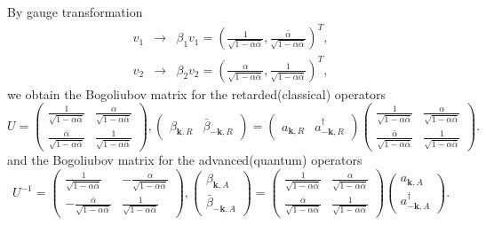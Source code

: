 \documentclass[aps,onecolumn,superscriptaddress,notitlepage,longbibliography]{revtex4-1}
\newcommand{\tmmathbf}[1]{\ensuremath{\boldsymbol{#1}}}
\begin{document}
By gauge transformation
\begin{eqnarray}
  v_1 & \rightarrow & \beta_1 v_1 = \left( \frac{1}{\sqrt{1 - \alpha
  \bar{\alpha}}}, \frac{\bar{\alpha}}{\sqrt{1 - \alpha \bar{\alpha}}}
  \right)^T, \\
  v_2 & \rightarrow & \beta_2 v_2 = \left( \frac{\alpha}{\sqrt{1 - \alpha
  \bar{\alpha}}}, \frac{1}{\sqrt{1 - \alpha \bar{\alpha}}} \right)^T, 
\end{eqnarray}
we obtain the Bogoliubov matrix for the retarded(classical) operators
\begin{equation}
  U = \left(\begin{array}{cc}
    \frac{1}{\sqrt{1 - \alpha \bar{\alpha}}} & \frac{\alpha}{\sqrt{1 - \alpha
    \bar{\alpha}}}\\
    \frac{\bar{\alpha}}{\sqrt{1 - \alpha \bar{\alpha}}} & \frac{1}{\sqrt{1 -
    \alpha \bar{\alpha}}}
  \end{array}\right), \left(\begin{array}{cc}\beta_{\tmmathbf{k}, R} &
    \bar{\beta}_{- \tmmathbf{k}, R}\end{array}\right) = \left(\begin{array}{cc}a_{\tmmathbf{k}, R} &
    a^{\dagger}_{- \tmmathbf{k}, R}\end{array}\right)\left(\begin{array}{cc}
    \frac{1}{\sqrt{1 - \alpha \bar{\alpha}}} & \frac{\alpha}{\sqrt{1 - \alpha
    \bar{\alpha}}}\\
    \frac{\bar{\alpha}}{\sqrt{1 - \alpha \bar{\alpha}}} & \frac{1}{\sqrt{1 -
    \alpha \bar{\alpha}}}
  \end{array}\right).
\end{equation}
and the Bogoliubov matrix for the advanced(quantum) operators
\begin{equation}
  U^{- 1} = \left(\begin{array}{cc}
    \frac{1}{\sqrt{1 - \alpha \bar{\alpha}}} & - \frac{\alpha}{\sqrt{1 -
    \alpha \bar{\alpha}}}\\
    - \frac{\bar{\alpha}}{\sqrt{1 - \alpha \bar{\alpha}}} & \frac{1}{\sqrt{1 -
    \alpha \bar{\alpha}}}
  \end{array}\right), \left(\begin{array}{c}
    \beta_{\tmmathbf{k}, A}\\
    \bar{\beta}_{- \tmmathbf{k}, A}
  \end{array}\right) = \left(\begin{array}{cc}
    \frac{1}{\sqrt{1 - \alpha \bar{\alpha}}} & \frac{\alpha}{\sqrt{1 - \alpha
    \bar{\alpha}}}\\
    \frac{\bar{\alpha}}{\sqrt{1 - \alpha \bar{\alpha}}} & \frac{1}{\sqrt{1 -
    \alpha \bar{\alpha}}}
  \end{array}\right) \left(\begin{array}{c}
    a_{\tmmathbf{k}, A}\\
    a^{\dagger}_{- \tmmathbf{k}, A}
  \end{array}\right) .
\end{equation}
\end{document}
